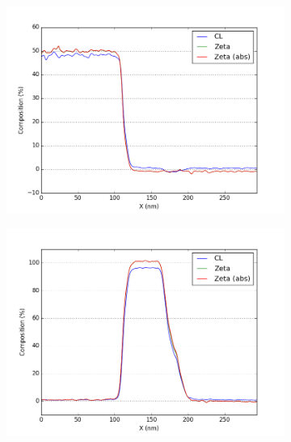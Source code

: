 \begin{figure}
\begin{subfigure}{.45\textwidth}
		\caption{}
		\label{fig:zeta_area1_ga}
	\end{subfigure}%
\hfill
	\begin{subfigure}{.45\textwidth}
		\centering
		\includegraphics[width=\linewidth]{fig/q/1_as_nm}
		\caption{}
		\label{fig:zeta_area1_as}
	\end{subfigure}
\hfill
		\begin{subfigure}{.45\textwidth}
			\centering
			\includegraphics[width=\linewidth]{fig/q/1_pd_nm}
			\caption{}
			\label{fig:zeta_area1_pd}
		\end{subfigure}%
	\hfill
		\begin{subfigure}{.45\textwidth}
			\centering

\end{subfigure}
\end{figure}
